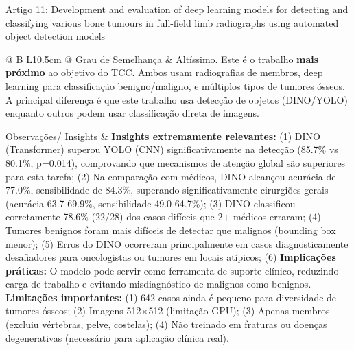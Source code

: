 \documentclass[12pt, a4paper]{article}
\begin{document}
\begin{fichabox}{Artigo 11: Development and evaluation of deep learning models for detecting and classifying various bone tumours in full-field limb radiographs using automated object detection models}
\begin{longtable}{@{} B L{10.5cm} @{}}
    Grau de Semelhança & Altíssimo. Este é o trabalho \textbf{mais próximo} ao objetivo do TCC. Ambos usam radiografias de membros, deep learning para classificação benigno/maligno, e múltiplos tipos de tumores ósseos. A principal diferença é que este trabalho usa detecção de objetos (DINO/YOLO) enquanto outros podem usar classificação direta de imagens. \\
    \addlinespace

    Observações/ Insights & \textbf{Insights extremamente relevantes:} (1) DINO (Transformer) superou YOLO (CNN) significativamente na detecção (85.7\% vs 80.1\%, p=0.014), comprovando que mecanismos de atenção global são superiores para esta tarefa; (2) Na comparação com médicos, DINO alcançou acurácia de 77.0\%, sensibilidade de 84.3\%, superando significativamente cirurgiões gerais (acurácia 63.7-69.9\%, sensibilidade 49.0-64.7\%); (3) DINO classificou corretamente 78.6\% (22/28) dos casos difíceis que 2+ médicos erraram; (4) Tumores benignos foram mais difíceis de detectar que malignos (bounding box menor); (5) Erros do DINO ocorreram principalmente em casos diagnosticamente desafiadores para oncologistas ou tumores em locais atípicos; (6) \textbf{Implicações práticas:} O modelo pode servir como ferramenta de suporte clínico, reduzindo carga de trabalho e evitando misdiagnóstico de malignos como benignos. \textbf{Limitações importantes:} (1) 642 casos ainda é pequeno para diversidade de tumores ósseos; (2) Imagens 512×512 (limitação GPU); (3) Apenas membros (excluiu vértebras, pelve, costelas); (4) Não treinado em fraturas ou doenças degenerativas (necessário para aplicação clínica real). \\

    \bottomrule
\end{longtable}
\end{fichabox}
\end{document}
